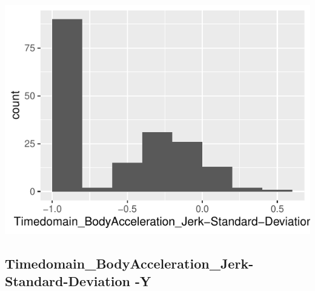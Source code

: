 \documentclass[
]{article}
\begin{document}
\begin{minipage}{0.25 \textwidth}

\includegraphics{codebook_tidydatasub_files/figure-latex/Var-18-Timedomain-BodyAcceleration-Jerk-Standard-Deviation--X-1.pdf}

\end{minipage}

\noindent\makebox[\linewidth]{\rule{\textwidth}{0.4pt}}

\hypertarget{timedomain_bodyacceleration_jerk-standard-deviation--y}{%
\subsection{Timedomain\_BodyAcceleration\_Jerk-Standard-Deviation
-Y}\label{timedomain_bodyacceleration_jerk-standard-deviation--y}}
\end{document}
